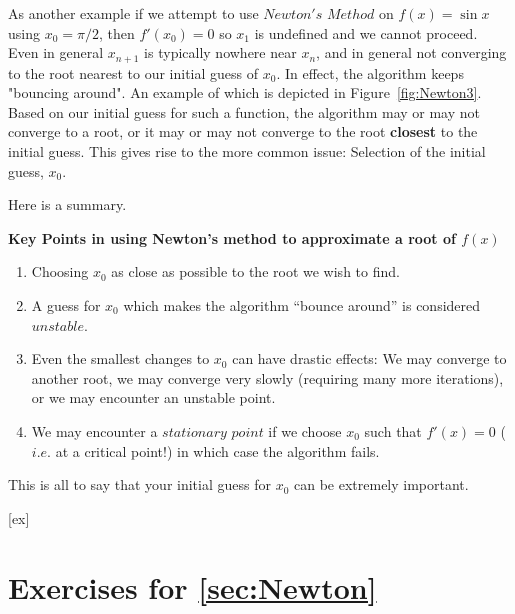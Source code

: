 As another example if we attempt to use $Newton's$ $Method$ on $f(x) =
\sin x$ using $x_0=\pi/2$, then $f'(x_0)=0$ so $x_1$ is undefined and we cannot proceed. 
Even in general $x_{n+1}$ is typically nowhere near $x_n$,
and in general not converging to the root nearest to our initial guess
of $x_0$.  In effect, the algorithm keeps "bouncing around". An example of which is depicted in Figure~\ref{fig:Newton3}. Based on
our initial guess for such a function, the algorithm may or may not
converge to a root, or it may or may not converge to the root {\bf
closest} to the initial guess.  This gives rise to the more common
issue: Selection of the initial guess, $x_0$.

Here is a summary.

{\bf Key Points in using Newton's method to approximate a root of $f(x)$}

\begin{enumerate}
\item Choosing $x_0$ as close as possible to the root we wish to find.
\item A guess for $x_0$ which makes the algorithm ``bounce around'' is considered $unstable$.
\item Even the smallest changes to $x_0$ can have drastic effects: We may converge to another root, 
we may converge very slowly (requiring many more iterations), or we may encounter an unstable point.
\item We may encounter a $stationary$ $point$ if we choose $x_0$ such that $f'(x)=0$ ($i.e.$ at a critical point!) in which case the algorithm fails.
\end{enumerate}

This is all to say that your initial guess for $x_0$ can be extremely
important.


[ex]
\section*{Exercises for \ref{sec:Newton}}

